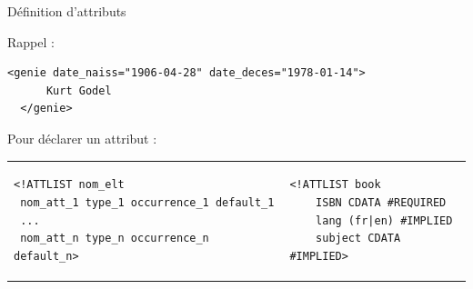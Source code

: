 \begin{frame}{Définition d'attributs}

Rappel :
\begin{lstlisting}[caption={\'Element \texttt{genie} et ses attributs}]
  <genie date_naiss="1906-04-28" date_deces="1978-01-14">
      Kurt Godel
  </genie>
\end{lstlisting}

\bigskip

Pour déclarer un attribut : \\

\medskip

\begin{tabular}{ll}
\begin{minipage}{0.55\textwidth}
\begin{small}
\begin{verbatim}
<!ATTLIST nom_elt
 nom_att_1 type_1 occurrence_1 default_1  
 ...
 nom_att_n type_n occurrence_n default_n> 
\end{verbatim}
\end{small}
\end{minipage}
&
\begin{minipage}{0.40\textwidth}
\begin{lstlisting}
<!ATTLIST book
    ISBN CDATA #REQUIRED 
    lang (fr|en) #IMPLIED
    subject CDATA #IMPLIED>
\end{lstlisting}
\end{minipage}\\
\end{tabular}

\framebreak


\end{frame}
